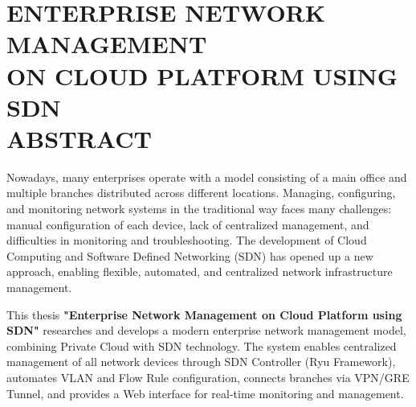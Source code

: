 \section*{\fontsize{16pt}{15pt}\selectfont ENTERPRISE NETWORK MANAGEMENT \\ON CLOUD PLATFORM USING SDN \\ABSTRACT}

Nowadays, many enterprises operate with a model consisting of a main office and multiple branches distributed across different locations. Managing, configuring, and monitoring network systems in the traditional way faces many challenges: manual configuration of each device, lack of centralized management, and difficulties in monitoring and troubleshooting. The development of Cloud Computing and Software Defined Networking (SDN) has opened up a new approach, enabling flexible, automated, and centralized network infrastructure management.

This thesis \textbf{"Enterprise Network Management on Cloud Platform using SDN"} researches and develops a modern enterprise network management model, combining Private Cloud with SDN technology. The system enables centralized management of all network devices through SDN Controller (Ryu Framework), automates VLAN and Flow Rule configuration, connects branches via VPN/GRE Tunnel, and provides a Web interface for real-time monitoring and management.

